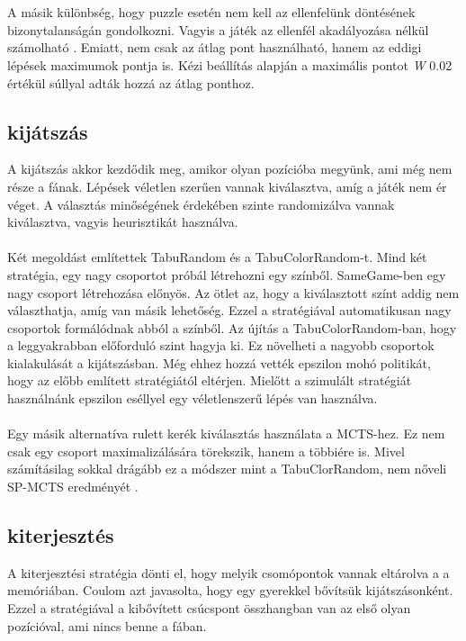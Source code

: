 \documentclass{article}
\begin{document}
	\\
	\\
	A másik különbség, hogy puzzle esetén nem kell az ellenfelünk döntésének bizonytalanságán gondolkozni. Vagyis a játék az ellenfél akadályozása nélkül számolható \cite{chaslot2010monte}. Emiatt, nem csak az átlag pont használható, hanem az eddigi lépések maximumok pontja is. Kézi beállítás alapján a maximális pontot \emph{W} 0.02 értékül súllyal adták hozzá az átlag ponthoz.\cite{schadd2012single}
	\\
	\subsection{kijátszás}
	
	A kijátszás akkor kezdődik meg, amikor olyan pozícióba megyünk, ami még nem része a fának. Lépések véletlen szerűen vannak kiválasztva, amíg a játék nem ér véget. A választás minőségének érdekében szinte randomizálva vannak kiválasztva, vagyis heurisztikát használva.
	\\
	\\
	Két megoldást említettek TabuRandom és a TabuColorRandom-t. Mind két stratégia, egy nagy csoportot próbál létrehozni egy színből. SameGame-ben egy nagy csoport létrehozása előnyös. Az ötlet az, hogy a kiválasztott színt addig nem választhatja, amíg van másik lehetőség. Ezzel a stratégiával automatikusan nagy csoportok formálódnak abból a színből. Az újítás a TabuColorRandom-ban, hogy a leggyakrabban előforduló szint hagyja ki. Ez növelheti a nagyobb csoportok kialakulását a kijátszásban. Még ehhez hozzá vették epszilon mohó politikát, hogy az előbb említett stratégiától eltérjen.\cite{sutton2018reinforcement} Mielőtt a szimulált stratégiát használnánk epszilon eséllyel egy véletlenszerű lépés van használva.
	\\
	\\
	Egy másik alternatíva rulett kerék kiválasztás használata a MCTS-hez. Ez nem csak egy csoport maximalizálására törekszik, hanem a többiére is. Mivel számításilag sokkal drágább ez a módszer mint a TabuClorRandom, nem nőveli SP-MCTS eredményét \cite{sutton2018reinforcement}.
	\\
	\subsection{kiterjesztés}
	
	A kiterjesztési stratégia dönti el, hogy melyik csomópontok vannak eltárolva a a memóriában. Coulom \cite{coulom2006efficient} azt javasolta, hogy egy gyerekkel bővítsük kijátszásonként. Ezzel a stratégiával a kibővített csúcspont összhangban van az első olyan pozícióval, ami nincs benne a fában.  
	\\
\end{document}
